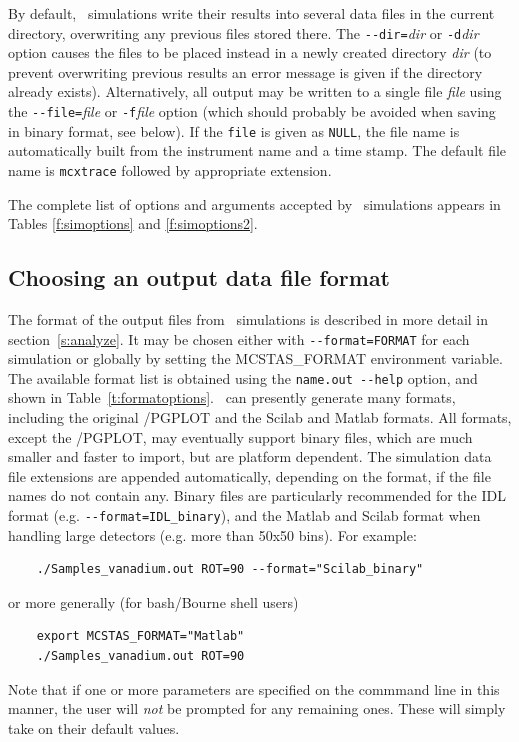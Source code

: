 By default, \MCX\ simulations write their results into several data files in the
current directory, overwriting any previous files stored there. The
\verb+--dir=+\textit{dir} or \verb+-d+\textit{dir} option causes the files to be
placed instead in a newly created directory \textit{dir} (to prevent overwriting
previous results an error message is given if the directory already exists).
Alternatively, all output may be written to a single file \textit{file} using
the \verb+--file=+\textit{file} or \verb+-f+\textit{file} option (which should
probably be avoided when saving in binary format, see below). If the \verb+file+ is given as \verb+NULL+, the file name is automatically built from the instrument name and a time stamp. The default file name is \verb+mcxtrace+ followed by appropriate extension.

The complete list of options
and arguments accepted by \MCX\ simulations appears in
Tables \ref{f:simoptions} and \ref{f:simoptions2}.

\subsection{Choosing an output data file format}

%
The format of the output files from \MCX\ simulations is described in
more detail in section~\ref{s:analyze}. It may be chosen either with \verb+--format=FORMAT+ for each simulation or globally by setting the MCSTAS\_FORMAT environment variable. 
The available format list is obtained using the \verb+name.out --help+ option, and shown in Table~\ref{t:formatoptions}.      
\MCX\ can presently generate many formats, including the original \MCX /PGPLOT and the Scilab and Matlab formats. All formats, except the \MCX /PGPLOT, may eventually support binary files, which are much smaller and faster to import, but are platform dependent. The simulation data file extensions are appended automatically, depending on the format, if the file names do not contain any. Binary files are particularly recommended for the IDL format (e.g. \verb+--format=IDL_binary+), and the Matlab and Scilab format when handling large detectors (e.g. more than 50x50 bins). For example:
\begin{verbatim}
    ./Samples_vanadium.out ROT=90 --format="Scilab_binary"
\end{verbatim}
or more generally (for bash/Bourne shell users)
\begin{verbatim}
    export MCSTAS_FORMAT="Matlab"
    ./Samples_vanadium.out ROT=90
\end{verbatim}
Note that if one or more parameters are specified on the commmand line in this
manner, the user will \emph{not} be prompted for any remaining ones. These will
simply take on their default values.

